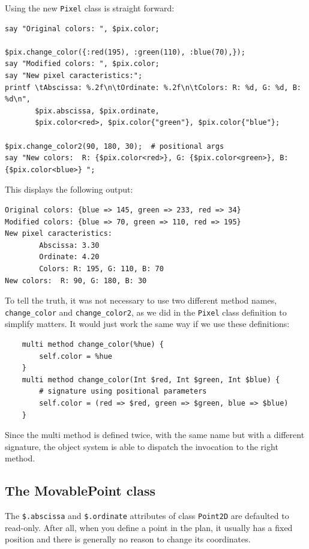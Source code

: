 Using the new {\tt Pixel} class is straight forward:

\begin{verbatim}
say "Original colors: ", $pix.color;

$pix.change_color({:red(195), :green(110), :blue(70),});
say "Modified colors: ", $pix.color;
say "New pixel caracteristics:";
printf \tAbscissa: %.2f\n\tOrdinate: %.2f\n\tColors: R: %d, G: %d, B: %d\n",
       $pix.abscissa, $pix.ordinate, 
       $pix.color<red>, $pix.color{"green"}, $pix.color{"blue"};

$pix.change_color2(90, 180, 30);  # positional args
say "New colors:  R: {$pix.color<red>}, G: {$pix.color<green>}, B: {$pix.color<blue>} ";
\end{verbatim}

This displays the following output:

\begin{verbatim}
Original colors: {blue => 145, green => 233, red => 34}
Modified colors: {blue => 70, green => 110, red => 195}
New pixel caracteristics:
        Abscissa: 3.30
        Ordinate: 4.20
        Colors: R: 195, G: 110, B: 70
New colors:  R: 90, G: 180, B: 30
\end{verbatim}

To tell the truth, it was not necessary to use two different 
method names, \verb'change_color' and \verb'change_color2', as 
we did in the {\tt Pixel} class definition to simplify matters. 
It would just work the same way if we use these definitions:

\begin{verbatim}
    multi method change_color(%hue) {
        self.color = %hue
    }
    multi method change_color(Int $red, Int $green, Int $blue) {
        # signature using positional parameters
        self.color = (red => $red, green => $green, blue => $blue)
    }
\end{verbatim} 

Since the multi method is defined twice, with the same name but 
with a different signature, the object system is able to 
dispatch the invocation to the right method.


\subsection{The MovablePoint class}

The \verb'$.abscissa' and \verb'$.ordinate' attributes of 
class {\tt Point2D} are defaulted to read-only. After all, 
when you define a point in the plan, it usually has a fixed 
position and there is generally no reason to change its 
coordinates.

